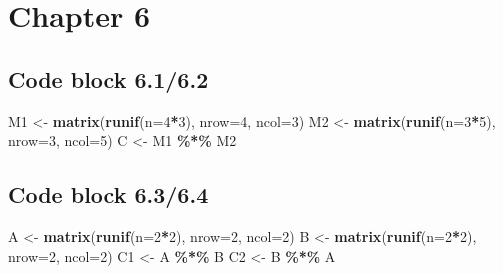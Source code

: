 \documentclass[
]{book}
\newenvironment{Shaded}{\begin{snugshade}}{\end{snugshade}}
\newcommand{\DataTypeTok}[1]{\textcolor[rgb]{0.13,0.29,0.53}{#1}}
\newcommand{\DecValTok}[1]{\textcolor[rgb]{0.00,0.00,0.81}{#1}}
\newcommand{\KeywordTok}[1]{\textcolor[rgb]{0.13,0.29,0.53}{\textbf{#1}}}
\newcommand{\NormalTok}[1]{#1}
\newcommand{\OperatorTok}[1]{\textcolor[rgb]{0.81,0.36,0.00}{\textbf{#1}}}
\newcommand{\StringTok}[1]{\textcolor[rgb]{0.31,0.60,0.02}{#1}}
\begin{document}
\hypertarget{chapter-6}{%
\section*{Chapter 6}\label{chapter-6}}

\hypertarget{code-block-6.16.2}{%
\subsection*{Code block 6.1/6.2}\label{code-block-6.16.2}}

\begin{Shaded}
\begin{Highlighting}[]
\NormalTok{M1 \textless{}{-}}\StringTok{ }\KeywordTok{matrix}\NormalTok{(}\KeywordTok{runif}\NormalTok{(}\DataTypeTok{n=}\DecValTok{4}\OperatorTok{*}\DecValTok{3}\NormalTok{), }\DataTypeTok{nrow=}\DecValTok{4}\NormalTok{, }\DataTypeTok{ncol=}\DecValTok{3}\NormalTok{)}
\NormalTok{M2 \textless{}{-}}\StringTok{ }\KeywordTok{matrix}\NormalTok{(}\KeywordTok{runif}\NormalTok{(}\DataTypeTok{n=}\DecValTok{3}\OperatorTok{*}\DecValTok{5}\NormalTok{), }\DataTypeTok{nrow=}\DecValTok{3}\NormalTok{, }\DataTypeTok{ncol=}\DecValTok{5}\NormalTok{)}
\NormalTok{C \textless{}{-}}\StringTok{ }\NormalTok{M1 }\OperatorTok{\%*\%}\StringTok{ }\NormalTok{M2}
\end{Highlighting}
\end{Shaded}

\hypertarget{code-block-6.36.4}{%
\subsection*{Code block 6.3/6.4}\label{code-block-6.36.4}}

\begin{Shaded}
\begin{Highlighting}[]
\NormalTok{A \textless{}{-}}\StringTok{ }\KeywordTok{matrix}\NormalTok{(}\KeywordTok{runif}\NormalTok{(}\DataTypeTok{n=}\DecValTok{2}\OperatorTok{*}\DecValTok{2}\NormalTok{), }\DataTypeTok{nrow=}\DecValTok{2}\NormalTok{, }\DataTypeTok{ncol=}\DecValTok{2}\NormalTok{)}
\NormalTok{B \textless{}{-}}\StringTok{ }\KeywordTok{matrix}\NormalTok{(}\KeywordTok{runif}\NormalTok{(}\DataTypeTok{n=}\DecValTok{2}\OperatorTok{*}\DecValTok{2}\NormalTok{), }\DataTypeTok{nrow=}\DecValTok{2}\NormalTok{, }\DataTypeTok{ncol=}\DecValTok{2}\NormalTok{)}
\NormalTok{C1 \textless{}{-}}\StringTok{ }\NormalTok{A }\OperatorTok{\%*\%}\StringTok{ }\NormalTok{B}
\NormalTok{C2 \textless{}{-}}\StringTok{ }\NormalTok{B }\OperatorTok{\%*\%}\StringTok{ }\NormalTok{A}
\end{Highlighting}
\end{Shaded}
\end{document}
